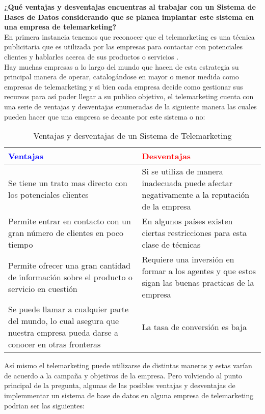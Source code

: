 \textbf{¿Qué ventajas y desventajas encuentras al trabajar con un Sistema de Bases de Datos
considerando que se planea implantar este sistema en una empresa de telemarketing?} \\

En primera instancia tenemos que reconocer que el telemarketing es una técnica publicitaria que es utilizada por las empresas para contactar con potenciales clientes y hablarles acerca de sus productos o servicios . \\

Hay muchas empresas a lo largo del mundo que hacen de esta estrategia su principal manera de operar, catalogándose en mayor o menor medida como empresas de telemarketing y si bien cada empresa decide como gestionar sus recursos para así poder llegar a su publico objetivo, el telemarketing cuenta con una serie de ventajas y desventajas enumeradas de la siguiente manera las cuales pueden hacer que una empresa se decante por este sistema o no: \\


\begin{table}[h!]
    \centering
    \begin{tabular}{|p{6cm}||p{6cm}|}
        \hline
        \textcolor{blue}{\textbf{Ventajas}} & \textcolor{Red}{\textbf{Desventajas}} \\ \hline 
        Se tiene un trato mas directo con los potenciales clientes & Si se utiliza de manera inadecuada puede afectar negativamente a la reputación de la empresa \\ \hline
        Permite entrar en contacto con un gran número de clientes en poco tiempo & En algunos países existen ciertas restricciones para esta clase de técnicas \\ \hline 
        Permite ofrecer una gran cantidad de información sobre el producto o servicio en cuestión  & Requiere una inversión en formar a los agentes y que estos sigan las buenas practicas de la empresa \\ \hline
        Se puede llamar a cualquier parte del mundo, lo cual asegura que nuestra empresa pueda darse a conocer en otras fronteras & La tasa de conversión es baja\\ \hline
    \end{tabular}
    \caption{Ventajas y desventajas de un Sistema de Telemarketing \cite{boada_cyberclick_2023}} 
\end{table}

Así mismo el telemarketing puede utilizarse de distintas maneras y estas varían de acuerdo a la campaña y objetivos de la empresa. Pero volviendo al punto principal de la pregunta, algunas de las posibles ventajas y desventajas de implemmentar un sistema de base de datos en alguna empresa de telemarketing podrian ser las siguientes:\\


